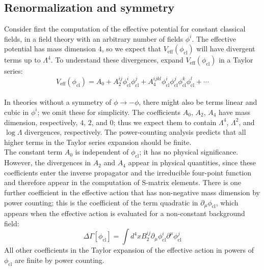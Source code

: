 \subsection{Renormalization and symmetry}
Consider first the computation of the effective potential for constant classical fields, in a field theory with an arbitrary number of fields $\phi^i$. The effective potential has mass dimension $4$, so we expect that $V_{\mathrm{eff}}(\phi_{\mathrm{cl}})$ will have divergent terms up to $\Lambda^4$. To understand these divergences,
expand $V_{\mathrm{eff}}(\phi_{\mathrm{cl}})$ in a Taylor series:
\[V_{\mathrm{eff}}(\phi_{\mathrm{cl}}) = A_0 + A_2^{ij}\phi_{\mathrm{cl}}^i \phi_{\mathrm{cl}}^j + A_4^{ijkl} \phi_{\mathrm{cl}}^i \phi_{\mathrm{cl}}^j \phi_{\mathrm{cl}}^k \phi_{\mathrm{cl}}^l + \cdots\]
\\
In theories without a symmetry of $\phi \to -\phi$, there might also be terms linear and cubic in $\phi^i$; we omit these for simplicity. The coefficients $A_0$, $A_2$, $A_4$ have mass dimension, respectively, $4$, $2$, and $0$; thus we expect them to contain $\Lambda^4$, $\Lambda^2$, and $\log \Lambda$ divergences, respectively. The power-counting analysis predicts that all higher terms in the Taylor series expansion should be finite.
\\
The constant term $A_0$ is independent of $\phi_{\mathrm{cl}}$; it has no physical significance. However, the divergences in $A_2$ and $A_4$ appear in physical quantities, since these coefficients enter the inverse propagator and the irreducible four-point function and therefore appear in the computation of S-matrix elements. There is one further coefficient in the effective action that has non-negative mass dimension by power counting; this is the coefficient of the term quadratic in $\partial_{\mu} \phi_{\mathrm{cl}}$, which appears when the effective action is evaluated for a non-constant background field:
\[\Delta \Gamma [\phi_{\mathrm{cl}}] = \int d^4x B_2^{ij} \partial_{\mu} \phi_{\mathrm{cl}}^i \partial^{\mu} \phi_{\mathrm{cl}}^j\]
All other coefficients in the Taylor expansion of the effective action in powers of $\phi_{\mathrm{cl}}$ are finite by power counting.
\\
